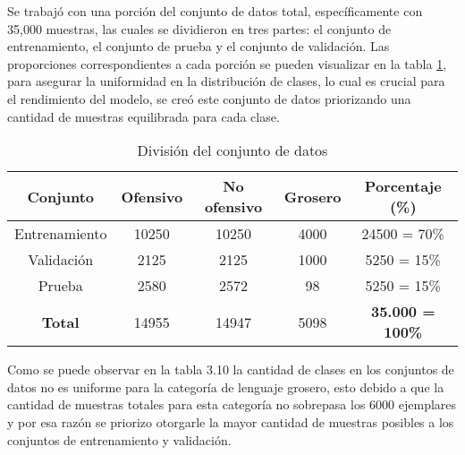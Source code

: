 Se trabajó con una porción del conjunto de datos total, específicamente con 35,000 muestras, las cuales se dividieron en tres partes: el conjunto de entrenamiento, el conjunto de prueba y el conjunto de validación. Las proporciones correspondientes a cada porción se pueden visualizar en la tabla \ref{tbl:conjuntos}, para asegurar la uniformidad en la distribución de clases, lo cual es crucial para el rendimiento del modelo, se creó este conjunto de datos priorizando una cantidad de muestras equilibrada para cada clase.


\begin{table}[!ht]
	\centering
	\begin{tabular}{|c|c|c|c|c|}
		\hline
		\textbf{Conjunto} & \textbf{Ofensivo} & \textbf{No ofensivo} & \textbf{Grosero} & \textbf{Porcentaje (\%)} \\ \hline
		Entrenamiento & 10250 & 10250 & 4000 & 24500 = 70\% \\ 
		Validación & 2125 & 2125 & 1000 & 5250 = 15\% \\ 
		Prueba & 2580 & 2572 & 98 & 5250 = 15\% \\ \hline
		\textbf{Total} & 14955 & 14947 & 5098 & \textbf{35.000 = 100\%} \\ \hline
	\end{tabular}
	\caption{División del conjunto de datos}
	\label{tbl:conjuntos}
\end{table}


Como se puede observar en la tabla 3.10 la cantidad de clases en los conjuntos de datos no es uniforme para la categoría de lenguaje grosero, esto debido a que la cantidad de muestras totales para esta categoría no sobrepasa los 6000 ejemplares y por esa razón se priorizo otorgarle la mayor cantidad de muestras posibles a los conjuntos de entrenamiento y validación.